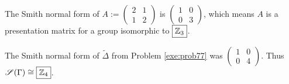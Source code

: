 \documentclass[../algebraNotesMSRI-UP2016.tex]{subfiles}
\begin{document}
\begin{frame}[c]
The Smith normal form of $A:=\left(\begin{smallmatrix} 2 & 1 \\ 1 & 2\end{smallmatrix}\right)$ is $\left(\begin{smallmatrix} 1 & 0 \\ 0 & 3 \end{smallmatrix}\right)$, which means $A$ is a presentation matrix for a group isomorphic to $\boxed{\mathbb Z_3}$.

\smallGap
{}
The Smith normal form of $\tilde{\Delta}$ from Problem \ref{exe:prob77} was $\left(\begin{smallmatrix} 1 & 0 \\ 0 & 4 \end{smallmatrix}\right)$.  Thus $\mathscr S(\Gamma)\cong \boxed{\mathbb Z_4}$.
\end{frame}
\end{document}
